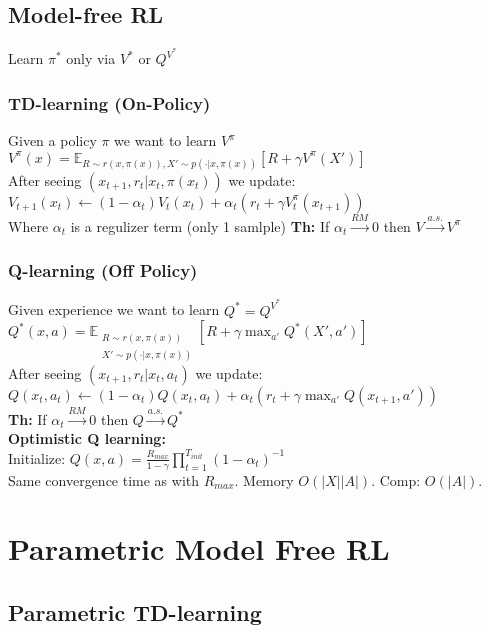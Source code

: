 \subsection{Model-free RL}
Learn $\pi^*$ only via $V^*$ or $Q^{V^*}$

\subsubsection{TD-learning (On-Policy)}
Given a policy $\pi$ we want to learn $V^\pi$\\
$V^\pi(x)=\mathbb{E}_{R\sim r(x,\pi(x)), X'\sim p(\cdot\vert x, \pi(x))}\left[R + \gamma V^\pi(X')\right]$\\
After seeing $(x_{t+1}, r_t \vert x_t, \pi(x_t))$ we update: \\
$V_{t+1}(x_t)\gets (1-\alpha_t)V_{t}(x_t) + \alpha_t(r_t + \gamma V_t^\pi(x_{t+1}))$\\
Where $\alpha_t$ is a regulizer term (only 1 samlple)
\textbf{Th:} If $\alpha_t\xrightarrow{RM}0$ then $V\xrightarrow{a.s.}V^\pi$

\subsubsection{Q-learning (Off Policy)}
Given experience we want to learn $Q^* = Q^{V^*}$\\
$Q^*(x,a) = \mathbb{E}_{\substack{R\sim r(x,\pi(x)) \\ X'\sim p(\cdot\vert x, \pi(x))}}\left[R+\gamma \max_{a'} Q^*(X',a')\right]$\\
After seeing $(x_{t+1}, r_t \vert x_t, a_t)$ we update: \\
$Q(x_t,a_t) ${\scriptsize $\gets (1-\alpha_t)Q(x_t,a_t) + \alpha_t(r_t+\gamma \max_{a'}Q(x_{t+1}, a'))$}\\
\textbf{Th:} If $\alpha_t\xrightarrow{RM}0$ then $Q\xrightarrow{a.s.}Q^{*}$\\
\textbf{Optimistic Q learning:}\\
Initialize: $Q(x,a)=\frac{R_{max}}{1-\gamma}\prod_{t=1}^{T_{init}}(1-\alpha_t)^{-1}$\\
Same convergence time as with $R_{max}$. Memory $O(|X||A|)$. Comp: $O(|A|)$.

\section{Parametric Model Free RL}
\subsection{Parametric TD-learning}
